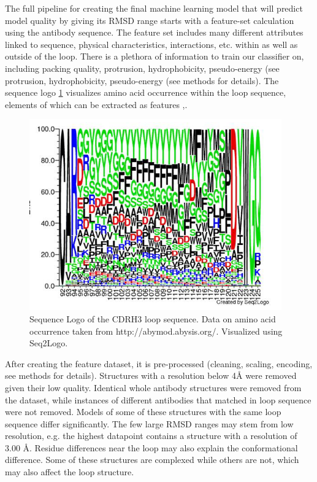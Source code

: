 \documentclass[preprint,12pt]{elsarticle}
\begin{document}
The full pipeline for creating the final machine learning model that will predict model quality by giving its RMSD range starts with a feature-set calculation using the antibody sequence. The feature set includes many different attributes linked to sequence, physical characteristics, interactions, etc. within as well as outside of the loop. There is a plethora of information to train our classifier on, including packing quality, protrusion, hydrophobicity, pseudo-energy (see protrusion, hydrophobicity, pseudo-energy (see methods for details). The sequence logo \ref{fig:logo} visualizes amino acid occurrence within the loop sequence, elements of which can be extracted as features \cite{Thomsen2012},\cite{Shaner1993}. 

\begin{figure}[h!]
  \includegraphics[scale=0.9]{logo.png}
  \caption {Sequence Logo of the CDRH3 loop sequence. Data on amino acid occurrence taken from http://abymod.abysis.org/. Visualized using Seq2Logo.}
  \label{fig:logo}
\end{figure}
After creating the feature dataset, it is pre-processed (cleaning, scaling, encoding, see methods for details). Structures with a resolution below 4Å were removed given their low quality. Identical whole antibody structures were removed from the dataset, while instances of different antibodies that matched in loop sequence were not removed. Models of some of these structures with the same loop sequence differ significantly. The few large RMSD ranges may stem from low resolution, e.g. the highest datapoint contains a structure with a resolution of 3.00 Å.  Residue differences near the loop may also explain the conformational difference. Some of these structures are complexed while others are not, which may also affect the loop structure.
\end{document}
